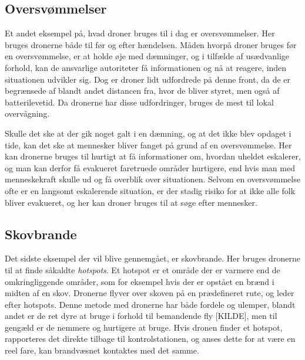 \subsection{Oversvømmelser}
Et andet eksempel på, hvad droner bruges til i dag er oversvømmelser. Her bruges dronerne både til før og efter hændelsen. Måden hvorpå droner bruges før en oversvømmelse, er at holde øje med dæmninger, og i tilfælde af usædvanlige forhold, kan de ansvarlige autoriteter få informationen og nå at reagere, inden situationen udvikler sig. Dog er droner lidt udfordrede på denne front, da de er begrænsede af blandt andet distancen fra, hvor de bliver styret, men også af batterilevetid. Da dronerne har disse udfordringer, bruges de mest til lokal overvågning. 
\par
Skulle det ske at der gik noget galt i en dæmning, og at det ikke blev opdaget i tide, kan det ske at mennesker bliver fanget på grund af en oversvømmelse. Her kan dronerne bruges til hurtigt at få informationer om, hvordan uheldet eskalerer, og man kan derfor få evakueret faretruede områder hurtigere, end hvis man med menneskekraft skulle ud og få overblik over situationen. Selvom en oversvømmelse ofte er en langsomt eskalerende situation, er der stadig risiko for at ikke alle folk bliver evakueret, og her kan droner bruges til at søge efter mennesker.

\subsection{Skovbrande}
Det sidste eksempel der vil blive gennemgået, er skovbrande. Her bruges dronerne til at finde såkaldte \textit{hotspots}. Et hotspot er et område der er varmere end de omkringliggende områder, som for eksempel hvis der er opstået en brænd i midten af en skov. Dronerne flyver over skoven på en prædefineret rute, og leder efter hotspots. Denne metode med dronerne har både fordele og ulemper, blandt andet er de ret dyre at bruge i forhold til bemandende fly [KILDE], men til gengæld er de nemmere og hurtigere at bruge. Hvis dronen finder et hotspot, rapporteres det direkte tilbage til kontrolstationen, og anses dette for at være en reel fare, kan brandvæsnet kontaktes med det samme. 


